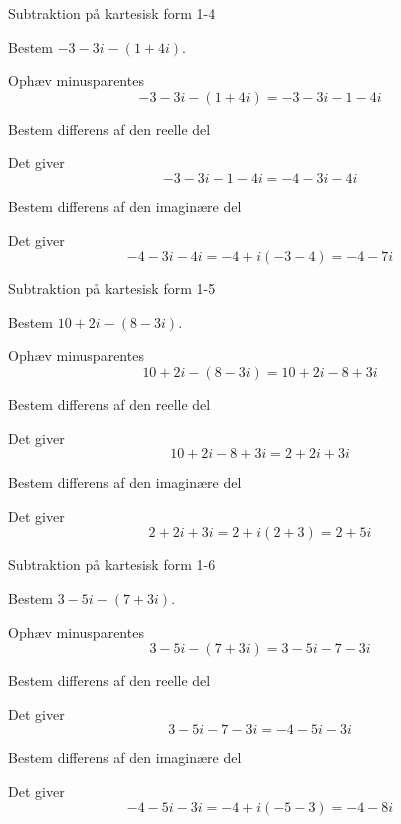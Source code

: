 \documentclass{article}
\begin{document}
\newpage

\begin{exercise}{Subtraktion på kartesisk form 1-4}
	
	Bestem $-3-3i-(1+4i)$.
	
	
	\hint
	
	Ophæv minusparentes
	\[
	-3-3i-(1+4i) = -3 - 3i - 1 - 4i
	\]
	
	\hint
	
	Bestem differens af den reelle del
	
	\hint
	
	Det giver
	\[
	-3 - 3i - 1 - 4i = -4 -3i -4i
	\]
	
	\hint
	
	Bestem differens af den imaginære del 
	
	
	\hint
	
	Det giver 
	\[
	-4 -3i -4i = -4 + i(-3-4) = -4 -7i
	\]
	
\end{exercise}

\newpage

\begin{exercise}{Subtraktion på kartesisk form 1-5}
	
	Bestem $10+2i-(8-3i)$.
	
	
	\hint
	
	Ophæv minusparentes
	\[
	10+2i-(8-3i) = 10 + 2i - 8 + 3i
	\]
	
	\hint
	
	Bestem differens af den reelle del
	
	\hint
	
	Det giver
	\[
	10 + 2i - 8 + 3i  = 2 +2i + 3i	
	\]
	
	\hint
	
	Bestem differens af den imaginære del 
	
	
	\hint
	
	Det giver 
	\[
	2 +2i + 3i = 2 + i(2+3) = 2 + 5i
	\]
	
\end{exercise}

\newpage

\begin{exercise}{Subtraktion på kartesisk form 1-6}
	
	Bestem $3-5i-(7+3i)$.
	
	
	\hint
	
	Ophæv minusparentes
	\[
	3-5i-(7+3i) = 3 - 5i - 7 - 3i
	\]
	
	\hint
	
	Bestem differens af den reelle del
	
	\hint
	
	Det giver
	\[
	3 - 5i - 7 - 3i = -4 -5i -3i
	\]
	
	\hint
	
	Bestem differens af den imaginære del 
	
	
	\hint
	
	Det giver 
	\[
	-4 -5i -3i = -4 + i(-5-3) = -4 -8i
 	\]
	
\end{exercise}
\end{document}
